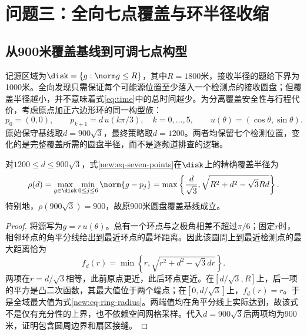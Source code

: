 \section{问题三：全向七点覆盖与环半径收缩}
\label{new:sec-q3}
\subsection{从900米覆盖基线到可调七点构型}
记源区域为$\disk=\{g:\norm g\le R\}$，其中$R=1800$米，接收半径的题给下界为1000米。全向发现只需保证每个可能源位置至少落入一个检测点的接收圆盘；但覆盖半径越小，并不意味着式\eqref{eq:time}中的总时间越少。为分离覆盖安全性与行程代价，考虑原点加正六边形环的同一构型族：
\begin{equation}\label{new:eq-seven-points}
p_0=(0,0),\qquad p_{k+1}=d\,u(k\pi/3),\quad k=0,\ldots,5,
\qquad u(\theta)=(\cos\theta,\sin\theta).
\end{equation}
原始保守基线取$d=900\sqrt3$，最终策略取$d=1200$。两者均保留七个检测位置，变化的是完整覆盖所需的圆盘半径，而不是逐频道排查的逻辑。

\begin{theorem}[七点构型的精确覆盖半径]\label{new:thm-ring-cover}
对$1200\le d\le900\sqrt3$，式\eqref{new:eq-seven-points}在$\disk$上的精确覆盖半径为
\begin{equation}\label{new:eq-ring-radius}
\rho(d)=\max_{g\in\disk}\min_{0\le j\le6}\norm{g-p_j}
=\max\left\{\frac d{\sqrt3},\sqrt{R^2+d^2-\sqrt3Rd}\right\}.
\end{equation}
特别地，$\rho(900\sqrt3)=900$，故原900米圆盘覆盖基线成立。
\end{theorem}
\begin{proof}
将源写为$g=r\,u(\theta)$。总有一个环点与之极角相差不超过$\pi/6$；固定$r$时，相邻环点的角平分线给出到最近环点的最坏距离。因此该圆周上到最近检测点的最大距离恰为
\begin{equation}\label{new:eq-ring-envelope}
f_d(r)=\min\left\{r,\sqrt{r^2+d^2-\sqrt3dr}\right\}.
\end{equation}
两项在$r=d/\sqrt3$相等，此前原点更近，此后环点更近。在$[d/\sqrt3,R]$上，后一项的平方是凸二次函数，其最大值位于两个端点；在$[0,d/\sqrt3]$上，$f_d(r)=r$。于是全域最大值为式\eqref{new:eq-ring-radius}。两端值均在角平分线上实际达到，故该式不是仅有充分性的上界，也不依赖空间网格采样。代入$d=900\sqrt3$后两项均为900米，证明包含圆周边界和扇区接缝。
\end{proof}

